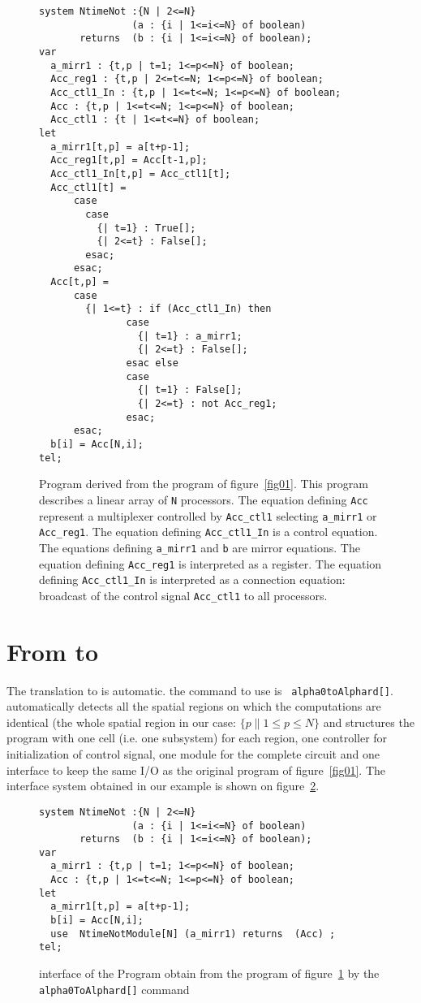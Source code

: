 {\small
\begin{figure}[h]
\begin{verbatim}
system NtimeNot :{N | 2<=N}
                (a : {i | 1<=i<=N} of boolean)
       returns  (b : {i | 1<=i<=N} of boolean);
var
  a_mirr1 : {t,p | t=1; 1<=p<=N} of boolean;
  Acc_reg1 : {t,p | 2<=t<=N; 1<=p<=N} of boolean;
  Acc_ctl1_In : {t,p | 1<=t<=N; 1<=p<=N} of boolean;
  Acc : {t,p | 1<=t<=N; 1<=p<=N} of boolean;
  Acc_ctl1 : {t | 1<=t<=N} of boolean;
let
  a_mirr1[t,p] = a[t+p-1];
  Acc_reg1[t,p] = Acc[t-1,p];
  Acc_ctl1_In[t,p] = Acc_ctl1[t];
  Acc_ctl1[t] = 
      case
        case
          {| t=1} : True[];
          {| 2<=t} : False[];
        esac;
      esac;
  Acc[t,p] = 
      case
        {| 1<=t} : if (Acc_ctl1_In) then 
               case
                 {| t=1} : a_mirr1;
                 {| 2<=t} : False[];
               esac else 
               case
                 {| t=1} : False[];
                 {| 2<=t} : not Acc_reg1;
               esac;
      esac;
  b[i] = Acc[N,i];
tel;
\end{verbatim}
\caption{Program {\AlphaZ} derived from the program of
figure~\ref{fig01}.  This {\AlphaZ} program describes a linear array
of {\tt N} processors.  The equation defining {\tt Acc} represent a
multiplexer controlled by {\tt Acc\_ctl1} selecting {\tt a\_mirr1} or
{\tt Acc\_reg1}. The equation defining {\tt Acc\_ctl1\_In} is a control
equation. The equations defining {\tt a\_mirr1} and {\tt b} are mirror
equations. The equation defining {\tt Acc\_reg1} is interpreted as a
register. The equation defining {\tt Acc\_ctl1\_In} is interpreted as 
a connection equation: broadcast of the control  signal {\tt Acc\_ctl1}
to all processors.}
\label{fig03}
\end{figure}
}
\section{From {\AlphaZ} to {\AlpHard}}
The translation to {\AlpHard} is automatic. the command to use is {\tt
alpha0toAlphard[]}. {\mmalpha} automatically detects all the spatial
regions on which the computations are identical (the whole spatial
region in our case: {\tt $\{ p \| 1 \leq p \leq N\}$} and structures
the program with one cell (i.e. one subsystem) for each region, one
controller for initialization of control signal, one module for the
complete circuit and one interface to keep the same I/O as the
original program of figure~\ref{fig01}. The interface system obtained in our 
example is shown on figure~\ref{fig04}.
{\small
\begin{figure}[h]
\begin{verbatim}
system NtimeNot :{N | 2<=N}
                (a : {i | 1<=i<=N} of boolean)
       returns  (b : {i | 1<=i<=N} of boolean);
var
  a_mirr1 : {t,p | t=1; 1<=p<=N} of boolean;
  Acc : {t,p | 1<=t<=N; 1<=p<=N} of boolean;
let
  a_mirr1[t,p] = a[t+p-1];
  b[i] = Acc[N,i];
  use  NtimeNotModule[N] (a_mirr1) returns  (Acc) ;
tel;
\end{verbatim}
\caption{interface of the {\AlpHard} Program obtain from the program of figure~\ref{fig03} by the {\tt alpha0ToAlphard[]} command}
\label{fig04}
\end{figure}
}
